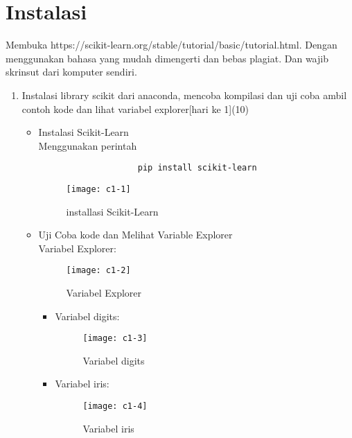 \section{Instalasi}
Membuka https://scikit-learn.org/stable/tutorial/basic/tutorial.html. Dengan menggunakan bahasa yang mudah dimengerti dan bebas plagiat.
Dan wajib skrinsut dari komputer sendiri.
\begin{enumerate}
	\item
	      Instalasi library scikit dari anaconda, mencoba kompilasi dan uji coba ambil contoh kode dan lihat variabel explorer[hari ke 1](10)\\
	      \begin{itemize}
		      \item
		            Instalasi Scikit-Learn\\
		            Menggunakan perintah
		            \begin{verbatim}
					pip install scikit-learn
					\end{verbatim}
		            \begin{figure}[H]
			            \centering
			            \texttt{[image: c1-1]}
			            \caption{installasi Scikit-Learn}
		            \end{figure}


		      \item
		            Uji Coba kode dan Melihat Variable Explorer\\
		            
		            Variabel Explorer:
		            \begin{figure}[H]
			            \centering
			            \texttt{[image: c1-2]}
			            \caption{Variabel Explorer}
		            \end{figure}
		            \begin{itemize}
			            \item
			                  Variabel digits:
			                  \begin{figure}[H]
				                  \centering
				                  \texttt{[image: c1-3]}
				                  \caption{Variabel digits}
			                  \end{figure}
			            \item
			                  Variabel iris:
			                  \begin{figure}[H]
				                  \centering
				                  \texttt{[image: c1-4]}
				                  \caption{Variabel iris}
			                  \end{figure}
		            \end{itemize}
	      \end{itemize}



\end{enumerate}
